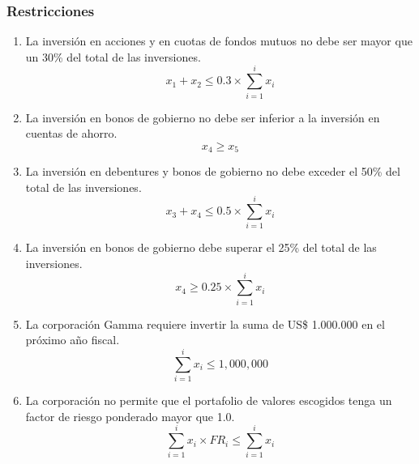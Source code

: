 \documentclass[a4paper,12pt]{article}
\begin{document}
\subsubsection{Restricciones}
\begin{enumerate}
	\item La inversión en acciones y en cuotas de fondos mutuos no debe ser mayor que un
	30\% del total de  las  inversiones.
	\begin{equation*}
		x_1 + x_2 \leq 0.3\times\sum_{i = 1}^{i}x_i
	\end{equation*}
	\item La  inversión  en  bonos  de  gobierno  no  debe  ser  inferior  a  la  inversión  en  cuentas  de  ahorro.
	\begin{equation*}
		x_4 \geq x_5
	\end{equation*}
	\item La inversión en debentures y bonos de gobierno no debe exceder el 50\% del total de las inversiones.
	\begin{equation*}
		x_3 + x_4 \leq 0.5\times\sum_{i = 1}^{i}x_i
	\end{equation*}
	\item La inversión en bonos de gobierno debe superar el 25\% del total de las inversiones.
	\begin{equation*}
		x_4 \geq 0.25\times\sum_{i = 1}^{i}x_i
	\end{equation*}
	\item La corporación Gamma    requiere invertir  la  suma  de  US\$  1.000.000  en el  próximo  año  fiscal.
	\begin{equation*}
		\sum_{i = 1}^{i}x_i \leq 1,000,000
	\end{equation*} 
	\item La corporación  no  permite  que el  portafolio  de  valores  escogidos  tenga  un  factor de  riesgo ponderado mayor que 1.0.
	\begin{equation*}
		\sum_{i = 1}^{i}x_i\times FR_i \leq \sum_{i = 1}^{i}x_i
	\end{equation*}
\end{enumerate}
\end{document}
